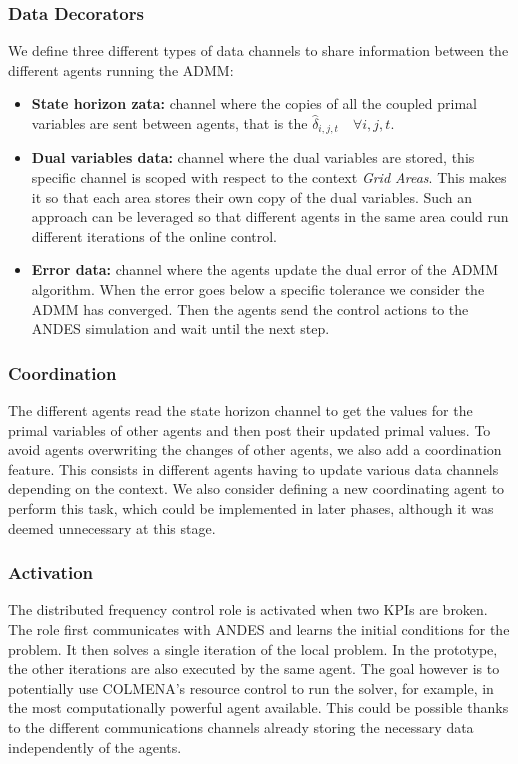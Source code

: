\documentclass{article}
\begin{document}
\subsubsection*{Data Decorators}

We define three different types of data channels to share information between the different agents running the ADMM:

\begin{itemize}
    \item \textbf{State horizon zata:} channel where the copies of all the coupled primal variables are sent between agents, that is the $\hat{\delta}_{i,j,t} \quad \forall i,j,t$.
    \item \textbf{Dual variables data:} channel where the dual variables are stored, this specific channel is scoped with respect to the context \textit{Grid Areas}. This makes it so that each area stores their own copy of the dual variables. Such an approach can be leveraged so that different agents in the same area could run different iterations of the online control.
    \item \textbf{Error data:} channel where the agents update the dual error of the ADMM algorithm. When the error goes below a specific tolerance we consider the ADMM has converged. Then the agents send the control actions to the ANDES simulation and wait until the next step.
\end{itemize}

\subsubsection*{Coordination}

The different agents read the state horizon channel to get the values for the primal variables of other agents and then post their updated primal values. To avoid agents overwriting the changes of other agents, we also add a coordination feature. This consists in different agents having to update various data channels depending on the context. We also consider defining a new coordinating agent to perform this task, which could be implemented in later phases, although it was deemed unnecessary at this stage.

\subsubsection*{Activation}

The distributed frequency control role is activated when two KPIs are broken. The role first communicates with ANDES and learns the initial conditions for the problem. It then solves a single iteration of the local problem. In the prototype, the other iterations are also executed by the same agent. The goal however is to potentially use COLMENA's resource control to run the solver, for example, in the most computationally powerful agent available. This could be possible thanks to the different communications channels already storing the necessary data independently of the agents.
\end{document}
